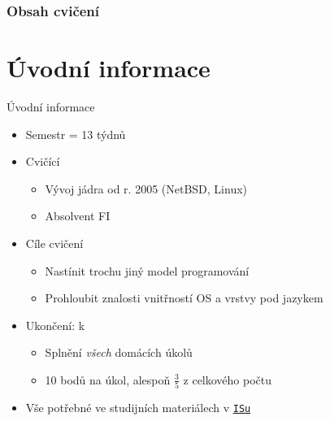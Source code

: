 


\subtitle{I. GIT a binární programování}
\date{20. 9. \the\year}



\begin{frame}
  \titlepage
\end{frame}


\begin{frame}
  \frametitle{Obsah cvičení}
  \tableofcontents
\end{frame}

\section{Úvodní informace}
\frame{\sectionpage}

\begin{frame}{Úvodní informace}

  \begin{itemize}
    \item Semestr = 13 týdnů

    \pause

    \item Cvičící
    \begin{itemize}
      \item Vývoj jádra od r. 2005 (NetBSD, Linux)
      \item Absolvent FI
    \end{itemize}

    \pause

    \item Cíle cvičení
    \begin{itemize}
      \item Nastínit trochu jiný model programování
      \item Prohloubit znalosti vnitřností OS a vrstvy pod jazykem
    \end{itemize}

    \pause

    \item Ukončení: k
    \begin{itemize}
      \item Splnění \emph{všech} domácích úkolů
      \item 10 bodů na úkol, alespoň $\frac{3}{5}$ z celkového počtu
    \end{itemize}

    \pause

    \item Vše potřebné ve studijních materiálech v \href{https://is.muni.cz/auth/el/1433/podzim2016/PB173/index.qwarp}{\nolinkurl{ISu}}

  \end{itemize}

\end{frame}

